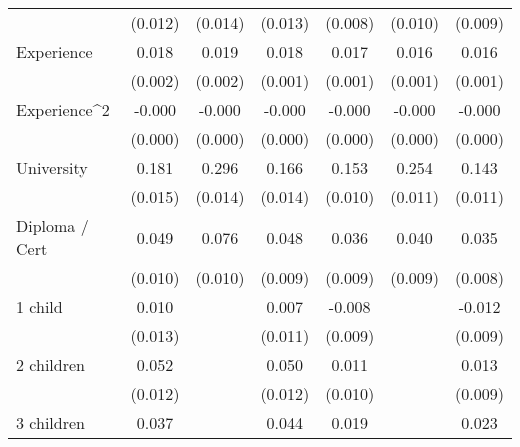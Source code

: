 {\begin{tabular}{l*{6}{c}}
                    &     (0.012)         &     (0.014)         &     (0.013)         &     (0.008)         &     (0.010)         &     (0.009)         \\
Experience          &       0.018\sym{***}&       0.019\sym{***}&       0.018\sym{***}&       0.017\sym{***}&       0.016\sym{***}&       0.016\sym{***}\\
                    &     (0.002)         &     (0.002)         &     (0.001)         &     (0.001)         &     (0.001)         &     (0.001)         \\
Experience^{2}      &      -0.000\sym{***}&      -0.000\sym{***}&      -0.000\sym{***}&      -0.000\sym{***}&      -0.000\sym{***}&      -0.000\sym{***}\\
                    &     (0.000)         &     (0.000)         &     (0.000)         &     (0.000)         &     (0.000)         &     (0.000)         \\
University          &       0.181\sym{***}&       0.296\sym{***}&       0.166\sym{***}&       0.153\sym{***}&       0.254\sym{***}&       0.143\sym{***}\\
                    &     (0.015)         &     (0.014)         &     (0.014)         &     (0.010)         &     (0.011)         &     (0.011)         \\
Diploma / Cert      &       0.049\sym{***}&       0.076\sym{***}&       0.048\sym{***}&       0.036\sym{***}&       0.040\sym{***}&       0.035\sym{***}\\
                    &     (0.010)         &     (0.010)         &     (0.009)         &     (0.009)         &     (0.009)         &     (0.008)         \\
1 child             &       0.010         &                     &       0.007         &      -0.008         &                     &      -0.012         \\
                    &     (0.013)         &                     &     (0.011)         &     (0.009)         &                     &     (0.009)         \\
2 children          &       0.052\sym{***}&                     &       0.050\sym{***}&       0.011         &                     &       0.013         \\
                    &     (0.012)         &                     &     (0.012)         &     (0.010)         &                     &     (0.009)         \\
3 children          &       0.037\sym{**} &                     &       0.044\sym{**} &       0.019         &                     &       0.023         \\

\end{tabular}}
